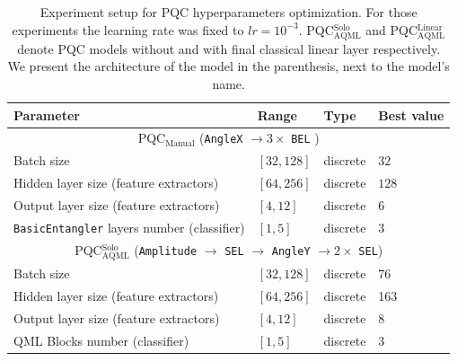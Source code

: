 \documentclass[runningheads]{llncs}
\begin{document}
\begin{table}[t]
	\centering
	\caption{Experiment setup for PQC hyperparameters optimization. For those experiments the learning rate was
		fixed to $lr = 10^{-3}$. PQC$^{\mathrm{Solo}}_{\mathrm{AQML}}$ and PQC$^{\mathrm{Linear}}_{\mathrm{AQML}}$ denote
		PQC models without and with final classical linear layer respectively. We present the architecture of the model
		in the parenthesis, next to the model's name.}
	\label{tab:pqc_hpo}
	\begin{tabular}{p{6cm}p{2cm}p{1.5cm}l}
		\hline
		\textbf{Parameter}                                 & \textbf{Range} & \textbf{Type} & \textbf{Best value}                                           \\
		\hline
		\multicolumn{4}{c}{PQC$_{\mathrm{Manual}}$ (\texttt{AngleX} $ \to 3 \times $ \texttt{BEL} )}                                                        \\
		\hline
		Batch size                                         & $[32, 128]$    & discrete      & $32$                                                          \\
		Hidden layer size (feature extractors)             & $[64, 256]$    & discrete      & $128$                                                         \\
		Output layer size (feature extractors)             & $[4, 12]$      & discrete      & $6$                                                           \\
		\texttt{BasicEntangler} layers number (classifier) & $[1, 5]$       & discrete      & $3$                                                           \\
		\hline
		\multicolumn{4}{c}{PQC$^{\mathrm{Solo}}_{\mathrm{AQML}}$ (\texttt{Amplitude} $\to$ \texttt{SEL} $\to$ \texttt{AngleY} $\to 2 \times$ \texttt{SEL})} \\
		\hline
		Batch size                                         & $[32, 128]$    & discrete      & 76                                                            \\
		Hidden layer size (feature extractors)             & $[64, 256]$    & discrete      & 163                                                           \\
		Output layer size (feature extractors)             & $[4, 12]$      & discrete      & 8                                                             \\
		QML Blocks number (classifier)                     & $[1, 5]$       & discrete      & 3                                                             \\

\end{tabular}
\end{table}
\end{document}

